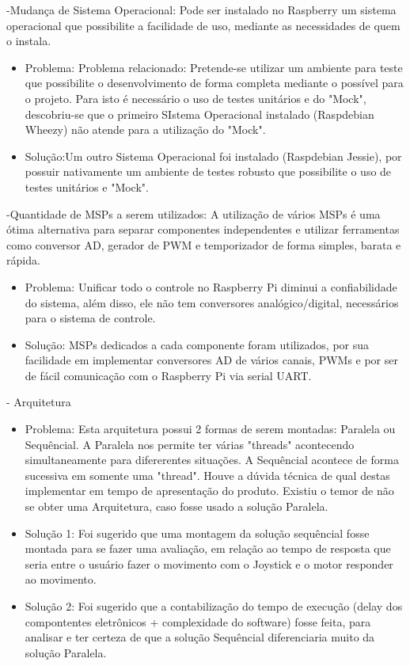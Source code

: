-Mudança de Sistema Operacional: Pode ser instalado no Raspberry um sistema operacional que possibilite a facilidade de uso, mediante as necessidades de quem o instala.
 \begin{itemize}
      \item Problema:  Problema relacionado: Pretende-se utilizar um ambiente para teste que possibilite o desenvolvimento de forma completa mediante o possível para o projeto. Para isto é necessário o uso de testes unitários e do "Mock", descobriu-se que o primeiro SIstema Operacional instalado (Raspdebian Wheezy) não atende para a utilização do "Mock".

	  \item Solução:Um outro Sistema Operacional foi instalado (Raspdebian Jessie), por possuir nativamente um ambiente de testes robusto que possibilite o uso de testes unitários e "Mock".
    \end{itemize}

-Quantidade de MSPs a serem utilizados: A utilização de vários MSPs é uma ótima alternativa para separar componentes independentes e utilizar ferramentas como conversor AD, gerador de PWM e temporizador de forma simples, barata e rápida.
 \begin{itemize}
      \item Problema: Unificar todo o controle no Raspberry Pi diminui a confiabilidade do sistema, além disso, ele não tem conversores analógico/digital, necessários para o sistema de controle.

	  \item Solução: MSPs dedicados a cada componente foram utilizados, por sua facilidade em implementar conversores AD de vários canais, PWMs e por ser de fácil comunicação com o Raspberry Pi via serial UART.

    \end{itemize}

- Arquitetura
 \begin{itemize}
      \item Problema: Esta arquitetura possui 2 formas de serem montadas: Paralela ou Sequêncial. A Paralela nos permite ter várias "threads" acontecendo simultaneamente para difererentes situações. A Sequêncial acontece de forma sucessiva em somente uma  "thread". Houve a dúvida técnica de qual destas implementar em tempo de apresentação do produto. Existiu o temor de não se obter uma Arquitetura, caso fosse usado a solução Paralela.

	  \item Solução 1: Foi sugerido que uma montagem da solução sequêncial fosse montada para se fazer uma avaliação, em relação ao tempo de resposta que seria entre o usuário fazer o movimento com o Joystick e o motor responder ao movimento.
  \item Solução 2: Foi sugerido que a contabilização do tempo de execução (delay dos compontentes eletrônicos + complexidade do software) fosse feita, para analisar e ter certeza de que a solução Sequêncial diferenciaria muito da solução Paralela.

    \end{itemize}

